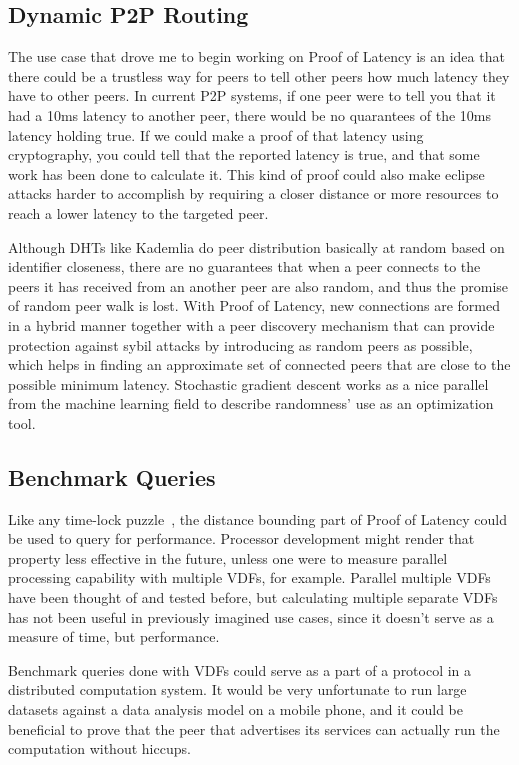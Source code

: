 \subsection{Dynamic P2P Routing}
The use case that drove me to begin working on Proof of Latency is an idea that there could be a trustless way for peers to tell other peers how much latency they have to other peers. In current P2P systems, if one peer were to tell you that it had a 10ms latency to another peer, there would be no quarantees of the 10ms latency holding true. If we could make a proof of that latency using cryptography, you could tell that the reported latency is true, and that some work has been done to calculate it. This kind of proof could also make eclipse attacks harder to accomplish by requiring a closer distance or more resources to reach a lower latency to the targeted peer.

Although DHTs like Kademlia do peer distribution basically at random based on identifier closeness, there are no guarantees that when a peer connects to the peers it has received from an another peer are also random, and thus the promise of random peer walk is lost. With Proof of Latency, new connections are formed in a hybrid manner together with a peer discovery mechanism that can provide protection against sybil attacks by introducing as random peers as possible, which helps in finding an approximate set of connected peers that are close to the possible minimum latency. Stochastic gradient descent works as a nice parallel from the machine learning field to describe randomness' use as an optimization tool.

\subsection{Benchmark Queries}
Like any time-lock puzzle~\cite{Mahmoody2013-zi}, the distance bounding part of Proof of Latency could be used to query for performance. Processor development might render that property less effective in the future, unless one were to measure parallel processing capability with multiple VDFs, for example. Parallel multiple VDFs have been thought of and tested before, but calculating multiple separate VDFs has not been useful in previously imagined use cases, since it doesn't serve as a measure of time, but performance.

Benchmark queries done with VDFs could serve as a part of a protocol in a distributed computation system. It would be very unfortunate to run large datasets against a data analysis model on a mobile phone, and it could be beneficial to prove that the peer that advertises its services can actually run the computation without hiccups.

